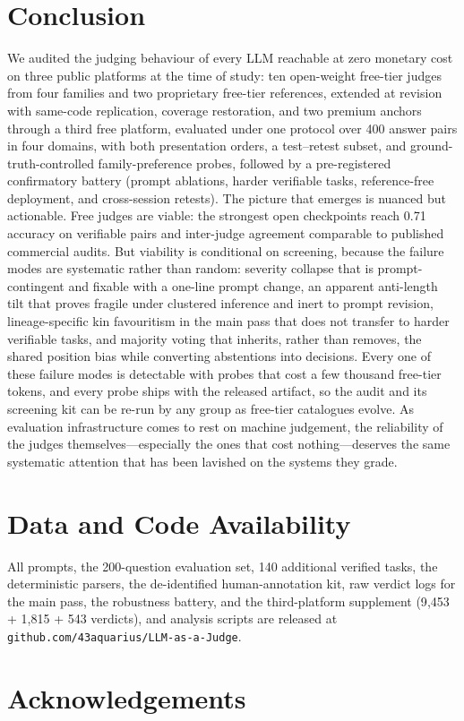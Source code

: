 \documentclass[review,12pt]{elsarticle}
\begin{document}
\section{Conclusion}
\label{sec:conclusion}

We audited the judging behaviour of every LLM reachable at zero
monetary cost on three public platforms at the time of study: ten
open-weight free-tier judges from four families and two proprietary
free-tier references, extended at revision with same-code replication,
coverage restoration, and two premium anchors through a third free
platform, evaluated under one protocol over 400 answer pairs
in four domains, with both presentation orders, a test--retest subset,
and ground-truth-controlled family-preference probes, followed by a
pre-registered confirmatory battery (prompt ablations, harder verifiable
tasks, reference-free deployment, and cross-session retests). The picture
that emerges is nuanced but actionable. Free judges are viable: the
strongest open checkpoints reach 0.71 accuracy on verifiable pairs and
inter-judge agreement comparable to published commercial audits. But
viability is conditional on screening, because the failure modes are
systematic rather than random: severity collapse that is prompt-contingent
and fixable with a one-line prompt change, an apparent anti-length tilt
that proves fragile under clustered inference and inert to prompt
revision, lineage-specific kin favouritism in the main pass that does not
transfer to harder verifiable tasks, and majority voting that inherits,
rather than removes, the shared position bias while converting
abstentions into decisions. Every one of these failure modes is
detectable with probes that cost a few thousand free-tier tokens, and
every probe ships with the released artifact, so the audit and its
screening kit can be re-run by any group as free-tier catalogues evolve.
As evaluation infrastructure comes to rest on machine judgement, the
reliability of the judges themselves---especially the ones that cost
nothing---deserves the same systematic attention that has been lavished
on the systems they grade.

\section*{Data and Code Availability}

All prompts, the 200-question evaluation set, 140 additional verified
tasks, the deterministic parsers, the de-identified human-annotation kit,
raw verdict logs for the main pass, the robustness battery, and the
third-platform supplement (9{,}453 + 1{,}815 + 543 verdicts), and
analysis scripts are released at
\texttt{github.com/43aquarius/LLM-as-a-Judge}.

\section*{Acknowledgements}


\end{document}
